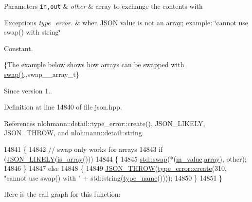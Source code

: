 \begin{DoxyParams}[1]{Parameters}
\mbox{\tt in,out}  & {\em other} & array to exchange the contents with\\
\hline
\end{DoxyParams}

\begin{DoxyExceptions}{Exceptions}
{\em type\+\_\+error.} & when J\+S\+ON value is not an array; example\+: {\ttfamily \char`\"{}cannot
use swap() with string\char`\"{}}\\
\hline
\end{DoxyExceptions}
Constant.

\{The example below shows how arrays can be swapped with {\ttfamily \hyperlink{classnlohmann_1_1basic__json_a8c9d932353e1ab98a7dc2fc27e002031}{swap()}}.,swap\+\_\+\+\_\+array\+\_\+t\}

\begin{DoxySince}{Since}
version 1.. 
\end{DoxySince}


Definition at line 14840 of file json.\+hpp.



References nlohmann\+::detail\+::type\+\_\+error\+::create(), J\+S\+O\+N\+\_\+\+L\+I\+K\+E\+LY, J\+S\+O\+N\+\_\+\+T\+H\+R\+OW, and nlohmann\+::detail\+::string.


\begin{DoxyCode}
14841     \{
14842         \textcolor{comment}{// swap only works for arrays}
14843         \textcolor{keywordflow}{if} (\hyperlink{json_8hpp_a41ecd1c4cf7c3d56477b9b685b5daa72}{JSON\_LIKELY}(\hyperlink{classnlohmann_1_1basic__json_aef9ce5dd2381caee1f8ddcdb5bdd9c65}{is\_array}()))
14844         \{
14845             \hyperlink{json_8hpp_a907191b7578e209391ce938e3b2afdf7}{std::swap}(*(\hyperlink{classnlohmann_1_1basic__json_aeb0814f76966f99290cb29e127c90a77}{m\_value}.\hyperlink{unionnlohmann_1_1basic__json_1_1json__value_a7947687f3ae1911d6e9847e2b3226157}{array}), other);
14846         \}
14847         \textcolor{keywordflow}{else}
14848         \{
14849             \hyperlink{json_8hpp_a6c274f6db2e65c1b66c7d41b06ad690f}{JSON\_THROW}(\hyperlink{classnlohmann_1_1detail_1_1type__error_aecc083aea4b698c33d042670ba50c10f}{type\_error::create}(310, \textcolor{stringliteral}{"cannot use swap() with "} + 
      std::string(\hyperlink{classnlohmann_1_1basic__json_a9d0a478571f82f0163b96b2424cd998f}{type\_name}())));
14850         \}
14851     \}
\end{DoxyCode}
Here is the call graph for this function\+:
\mbox{\label{classnlohmann_1_1basic__json_ac31f12587d2f1a3be5ffc394aa9d72a4}} 
